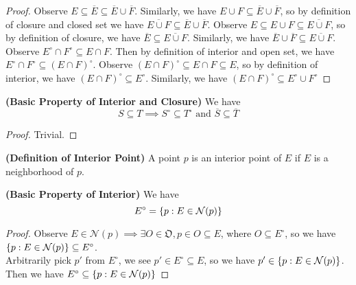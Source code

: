 \documentclass{report}
\begin{document}
\begin{proof}
Observe $E\subseteq \overline{E}\subseteq \overline{E}\cup \overline{F}$. Similarly, we have $E\cup F\subseteq \overline{E}\cup \overline{F}$, so by definition of closure and closed set we have $\overline{E\cup F}\subseteq \overline{E}\cup \overline{F}$. Observe $E\subseteq E\cup F\subseteq \overline{E\cup F}$, so by definition of closure, we have $\overline{E}\subseteq \overline{E\cup F}$. Similarly, we have $\overline{E}\cup \overline{F}\subseteq \overline{E\cup F}$.\\

Observe $E^\circ \cap F^\circ \subseteq E\cap F$. Then by definition of interior and open set, we have $ E^\circ \cap F^\circ\subseteq (E\cap F)^\circ$. Observe $(E\cap F)^\circ \subseteq E\cap F\subseteq E$, so by definition of interior, we have $(E\cap F)^\circ\subseteq E^\circ$. Similarly, we have $(E\cap F)^\circ\subseteq E^\circ \cup F^\circ$
\end{proof}
\begin{theorem}
\label{2.6.5}
\textbf{(Basic Property of Interior and Closure)} We have
\begin{equation}
S\subseteq T \implies S^\circ \subseteq T^\circ\text{ and }\overline{S}\subseteq \overline{T}
\end{equation}
\end{theorem}
\begin{proof}
Trivial.
\end{proof}
\begin{definition}
\label{2.6.6}
\textbf{(Definition of Interior Point)} A point $p$ is an interior point of $E$ if $E$ is  a neighborhood of  $p$.
\end{definition}
\begin{theorem}
\label{2.6.7}
\textbf{(Basic Property of Interior)} We have
\begin{equation}
E^\circ = \{ p:E\in \mathcal{N}(p) \}
\end{equation}
\end{theorem}
\begin{proof}
Observe $E\in \mathcal{N}(p)\implies \exists O\in\mathfrak{O}, p\in O\subseteq E$, where $O\subseteq E^\circ$, so we have  $\{ p:E\in \mathcal{N}(p) \}\subseteq E^\circ$.\\

Arbitrarily pick $p'$ from $E^\circ$, we see $p' \in E^\circ \subseteq E$, so we have $p'\in \{ p:E\in \mathcal{N}(p) \}$. Then we have $E^\circ \subseteq \{ p:E\in \mathcal{N}(p) \}$ 
\end{proof}
\end{document}
